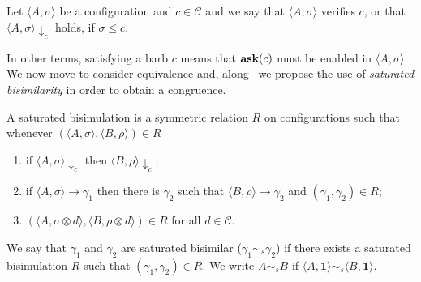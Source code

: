 \documentclass{llncs}
\newcommand{\ask}{{\bf ask}}
\def\monid{{\mathbf 0}}
\def\monid{\mathbf{1}}
\begin{document}
\begin{definition} [Barbs]
Let $\langle A, \sigma \rangle$ be a configuration and $c \in \mathcal{C}$
and we say that $\langle A, \sigma \rangle$ verifies $c$, or that $\langle A, \sigma \rangle \downarrow_c$ holds, if  $\sigma \leq c$.
\end{definition}

In other terms, satisfying a barb $c$ means that $\hbox{\ask}(c)$ must be enabled in $\langle A, \sigma \rangle$.
%
We now move to consider equivalence and, %
along~\cite{pippo}
we propose the use of \emph{saturated bisimilarity}
in order to obtain a congruence.
%

\begin{definition}\label{def:strongsb} A saturated bisimulation is a symmetric relation $R$ on configurations such that whenever
$( \langle A, \sigma \rangle,\langle B, \rho \rangle) \in R$
\begin{enumerate}
\item if $\langle A, \sigma \rangle \downarrow_c$ then $\langle B, \rho \rangle \downarrow_c$;
\item if $\langle A, \sigma \rangle \to \gamma_1$ then there is $\gamma_2$ such that $\langle B, \rho \rangle \to \gamma_2$ and $(\gamma_1, \gamma_2) \in R$;
\item $(\langle A,\sigma \otimes d\rangle, \langle B,\rho \otimes d \rangle) \in R$ for  all $d \in \mathcal{C}$.
\end{enumerate}
We say that $\gamma_1$ and $\gamma_2$ are  saturated bisimilar ($\gamma_1  \sim_{\mathit{s}} \gamma_2$) if there exists a  saturated  bisimulation $R$ such that $(\gamma_1 , \gamma_2 ) \in R$. We write $A \sim_{\mathit{s}} B$ if $\langle A, \monid \rangle \sim_{\mathit{s}} \langle B, \monid \rangle$.
\end{definition}
\end{document}
